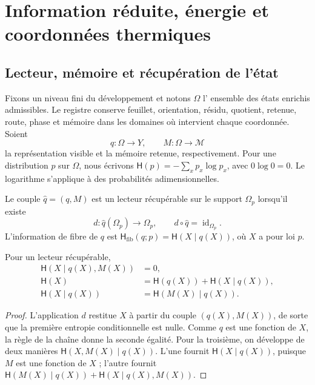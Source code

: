 \section{Information réduite, énergie et coordonnées thermiques}

\subsection{Lecteur, mémoire et récupération de l'état}

Fixons un niveau fini du développement et notons \(\Omega\) l'
ensemble des états enrichis admissibles. Le registre conserve feuillet,
orientation, résidu, quotient, retenue, route, phase et mémoire dans les
domaines où intervient chaque coordonnée. Soient
\[
 q:\Omega\longrightarrow Y,\qquad
 M:\Omega\longrightarrow\mathcal M
\]
la représentation visible et la mémoire retenue, respectivement. Pour une
distribution \(p\) sur \(\Omega\), nous écrivons
\(\mathsf H(p)=-\sum_xp_x\log p_x\), avec \(0\log0=0\).
Le logarithme s’applique à des probabilités adimensionnelles.

\begin{definition}
Le couple \(\widehat q=(q,M)\) est un lecteur récupérable sur le support
\(\Omega_p\) lorsqu'il existe
\[
 d:\widehat q(\Omega_p)\longrightarrow\Omega_p,
 \qquad d\circ\widehat q=\operatorname{id}_{\Omega_p}.
\]
L'information de fibre de \(q\) est
\(\mathsf H_{\mathrm{fib}}(q;p)=\mathsf H(X\mid q(X))\), où
\(X\) a pour loi \(p\).
\end{definition}

\begin{proposition}
Pour un lecteur récupérable,
\begin{align}
 \mathsf H(X\mid q(X),M(X))&=0,\\
 \mathsf H(X)&=\mathsf H(q(X))+\mathsf H(X\mid q(X)),\\
 \mathsf H(X\mid q(X))&=\mathsf H(M(X)\mid q(X)).
 \label{eq:ii-kb-aut-fibra}
\end{align}
\end{proposition}
\begin{proof}
L'application \(d\) restitue \(X\) à partir du couple \((q(X),M(X))\),
de sorte que la première entropie conditionnelle est nulle. Comme \(q\) est
une fonction de \(X\), la règle de la chaîne donne la seconde égalité.
Pour la troisième, on développe de deux manières
\(\mathsf H(X,M(X)\mid q(X))\). L'une fournit
\(\mathsf H(X\mid q(X))\), puisque \(M\) est une fonction de \(X\) ;
l'autre fournit
\(\mathsf H(M(X)\mid q(X))+\mathsf H(X\mid q(X),M(X))\).
\end{proof}

